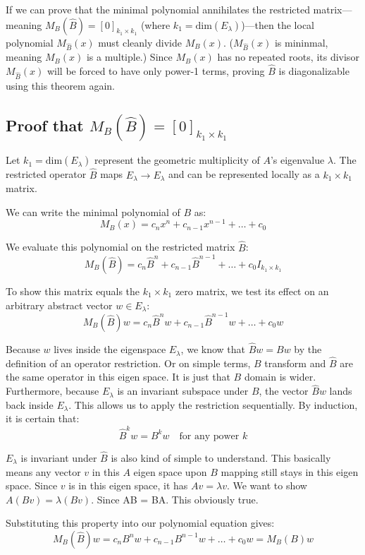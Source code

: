 \documentclass{article}
\begin{document}
If we can prove that the minimal polynomial annihilates the restricted matrix—meaning $M_B(\hat{B}) = [0]_{k_1 \times k_1}$ (where $k_1 = \text{dim}(E_\lambda)$)—then the local polynomial $M_{\hat{B}}(x)$ must cleanly divide $M_B(x)$. ($M_{\hat{B}}(x)$ is mininmal, meaning $M_B(x)$ is a multiple.) Since $M_B(x)$ has no repeated roots, its divisor $M_{\hat{B}}(x)$ will be forced to have only power-1 terms, proving $\hat{B}$ is diagonalizable using this theorem again.

\subsection{Proof that $M_B(\hat{B}) = [0]_{k_1 \times k_1}$}
Let $k_1 = \text{dim}(E_\lambda)$ represent the geometric multiplicity of $A$'s eigenvalue $\lambda$. The restricted operator $\hat{B}$ maps $E_\lambda \to E_\lambda$ and can be represented locally as a $k_1 \times k_1$ matrix.

We can write the minimal polynomial of $B$ as:
\[ M_B(x) = c_n x^n + c_{n-1} x^{n-1} + \dots + c_0 \]

We evaluate this polynomial on the restricted matrix $\hat{B}$:
\[ M_B(\hat{B}) = c_n \hat{B}^n + c_{n-1} \hat{B}^{n-1} + \dots + c_0 I_{k_1 \times k_1} \]

To show this matrix equals the $k_1 \times k_1$ zero matrix, we test its effect on an arbitrary abstract vector $w \in E_\lambda$:
\[ M_B(\hat{B})w = c_n \hat{B}^n w + c_{n-1} \hat{B}^{n-1} w + \dots + c_0 w \]

Because $w$ lives inside the eigenspace $E_\lambda$, we know that $\hat{B}w = Bw$ by the definition of an operator restriction. Or on simple terms, $B$ transform and $\hat{B}$ are the same operator in this eigen space. It is just that $B$ domain is wider. Furthermore, because $E_\lambda$ is an invariant subspace under $B$, the vector $\hat{B}w$ lands back inside $E_\lambda$. This allows us to apply the restriction sequentially. By induction, it is certain that:
\[ \hat{B}^k w = B^k w \quad \text{for any power } k \]

$E_\lambda$ is invariant under $\hat{B}$ is also kind of simple to understand. This basically means any vector $v$ in this $A$ eigen space upon $B$ mapping still stays in this eigen space. Since $v$ is in this eigen space, it has $Av = \lambda v$. We want to show $A(Bv) = \lambda (Bv)$. Since AB = BA. This obviously true.     

Substituting this property into our polynomial equation gives:
\[ M_B(\hat{B})w = c_n B^n w + c_{n-1} B^{n-1} w + \dots + c_0 w = M_B(B)w \]
\end{document}
